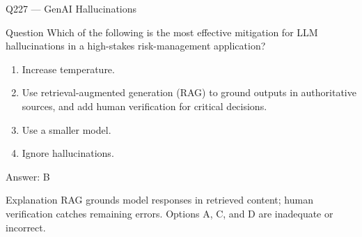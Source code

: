 \documentclass[aspectratio=169,8pt]{beamer}
\begin{document}
																																		\begin{frame}{Q227 --- GenAI Hallucinations}
																																			\begin{block}{Question}
																																				Which of the following is the most effective mitigation for LLM hallucinations in a high-stakes risk-management application?
																																				\begin{enumerate}
																																					\item Increase temperature.
																																					\item Use retrieval-augmented generation (RAG) to ground outputs in authoritative sources, and add human verification for critical decisions.
																																					\item Use a smaller model.
																																					\item Ignore hallucinations.
																																				\end{enumerate}  \end{block}
																																				\begin{exampleblock}{Answer: B}\end{exampleblock}
																																				\begin{block}{Explanation}
																																					RAG grounds model responses in retrieved content; human verification catches remaining errors. Options A, C, and D are inadequate or incorrect.
																																				\end{block}
																																			\end{frame}
																																			
\end{document}
